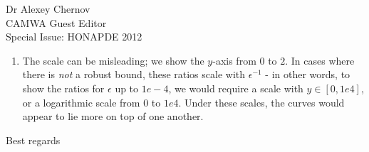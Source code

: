 \documentclass{letter}
\begin{document}
\begin{letter}{Dr Alexey Chernov\\CAMWA Guest Editor\\Special Issue: HONAPDE 2012}
\begin{enumerate}
In the second example, a discontinuous boundary condition is approximated by a 20 term Fourier series.  As refinements are introduced, the problem itself changes due to the improved resolution of the boundary condition at the inflow (the ``moving target" issue).  This further complicates the matter, and the ratio is consequentially more ``messy"; however, it is still very close to 1 for every $\epsilon$ we tested.  
\item The scale can be misleading; we show the $y$-axis from $0$ to $2$.  In cases where there is \textit{not} a robust bound, these ratios scale with $\epsilon^{-1}$ - in other words, to show the ratios for $\epsilon$ up to $1e-4$, we would require a scale with $y \in [0,1e4]$, or a logarithmic scale from $0$ to $1e4$.  Under these scales, the curves would appear to lie more on top of one another.
\end{enumerate}


\closing{Best regards}






\end{letter}
\end{document}
